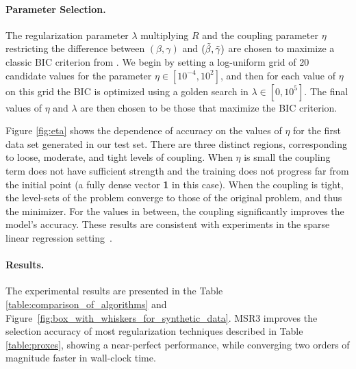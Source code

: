	
\paragraph{Parameter Selection.} The regularization parameter $\lambda$ 
multiplying $R$ and the 
coupling parameter $\eta$ restricting the difference between 
$(\beta,\gamma)$ and $(\tilde\beta,{\tilde{\gamma}})$ are chosen to maximize a classic 
BIC criterion from \cite{Jones2011}. 
We begin by setting a log-uniform grid of 20 candidate values for the parameter $\eta \in [10^{-4}, 10^2]$, and then for each value of $\eta$
on this grid 
the BIC is optimized using a golden search in $\lambda \in [0, 10^5]$. The final values of $\eta$ and $\lambda$ are then chosen
to be those that maximize the BIC criterion.
	
	Figure \ref{fig:eta} shows the dependence of accuracy on the values of $\eta$ for the first data set generated in our test set. There are three distinct regions, corresponding to loose, moderate, and tight levels of coupling. When $\eta$ is small the coupling term does not have sufficient strength and the training does not progress far from the initial point (a fully dense vector \textbf{1} in this case). When the coupling is tight, the level-sets of the problem converge to those of the original problem, and thus the minimizer. For the values in between, the coupling significantly improves the model's accuracy. 
These results are consistent with experiments in the sparse linear regression setting~\cite{Zheng2019SR3}. 

\paragraph{Results.}
The experimental results are presented in the Table \ref{table:comparison_of_algorithms} and Figure~\ref{fig:box_with_whiskers_for_synthetic_data}. MSR3 improves the selection accuracy of most regularization techniques 
described in Table \ref{table:proxes}, showing a near-perfect performance, while converging two orders of magnitude faster in wall-clock time. 

